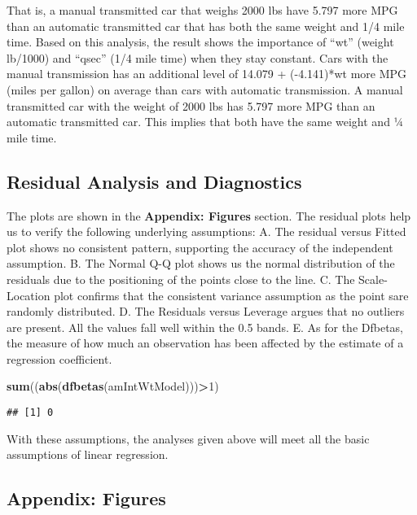 \documentclass[]{article}
\newenvironment{Shaded}{\begin{snugshade}}{\end{snugshade}}
\newcommand{\KeywordTok}[1]{\textcolor[rgb]{0.13,0.29,0.53}{\textbf{#1}}}
\newcommand{\DecValTok}[1]{\textcolor[rgb]{0.00,0.00,0.81}{#1}}
\newcommand{\OperatorTok}[1]{\textcolor[rgb]{0.81,0.36,0.00}{\textbf{#1}}}
\newcommand{\NormalTok}[1]{#1}
\begin{document}
That is, a manual transmitted car that weighs 2000 lbs have 5.797 more
MPG than an automatic transmitted car that has both the same weight and
1/4 mile time. Based on this analysis, the result shows the importance
of ``wt'' (weight lb/1000) and ``qsec'' (1/4 mile time) when they stay
constant. Cars with the manual transmission has an additional level of
14.079 + (-4.141)*wt more MPG (miles per gallon) on average than cars
with automatic transmission. A manual transmitted car with the weight of
2000 lbs has 5.797 more MPG than an automatic transmitted car. This
implies that both have the same weight and ¼ mile time.

\subsection{Residual Analysis and
Diagnostics}\label{residual-analysis-and-diagnostics}

The plots are shown in the \textbf{Appendix: Figures} section. The
residual plots help us to verify the following underlying assumptions:
A. The residual versus Fitted plot shows no consistent pattern,
supporting the accuracy of the independent assumption. B. The Normal Q-Q
plot shows us the normal distribution of the residuals due to the
positioning of the points close to the line. C. The Scale-Location plot
confirms that the consistent variance assumption as the point sare
randomly distributed. D. The Residuals versus Leverage argues that no
outliers are present. All the values fall well within the 0.5 bands. E.
As for the Dfbetas, the measure of how much an observation has been
affected by the estimate of a regression coefficient.

\begin{Shaded}
\begin{Highlighting}[]
\KeywordTok{sum}\NormalTok{((}\KeywordTok{abs}\NormalTok{(}\KeywordTok{dfbetas}\NormalTok{(amIntWtModel)))}\OperatorTok{>}\DecValTok{1}\NormalTok{)}
\end{Highlighting}
\end{Shaded}

\begin{verbatim}
## [1] 0
\end{verbatim}

With these assumptions, the analyses given above will meet all the basic
assumptions of linear regression.

\subsection{Appendix: Figures}\label{appendix-figures}
\end{document}
